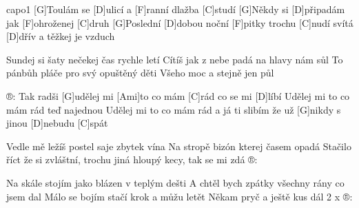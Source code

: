 \hfill capo1
[G]Toulám se [D]ulicí a [F]ranní dlažba [C]studí
[G]Někdy si [D]připadám jak [F]ohroženej [C]druh
[G]Poslední [D]dobou noční [F]pitky trochu [C]nudí
svítá [D]dřív a těžkej je vzduch

Sundej si šaty nečekej čas rychle letí
Cítíš jak z nebe padá na hlavy nám sůl
To pánbůh pláče pro svý opuštěný děti
Všeho moc a stejně jen půl

®: Tak radši [G]udělej mi 
[Ami]to co mám [C]rád co se mi [D]líbí
Udělej mi to co mám rád teď najednou
Udělej mi to co mám rád a já ti slibím
že už [G]nikdy s jinou [D]nebudu [C]spát

Vedle mě ležíš postel saje zbytek vína
Na stropě bizón kterej časem opadá
Stačilo říct že si zvláštní, trochu jiná
hloupý kecy, tak se mi zdá
®:

Na skále stojím jako blázen v teplým dešti
A chtěl bych zpátky všechny rány co jsem dal
Málo se bojím stačí krok a můžu letět
Někam pryč a ještě kus dál
2 x ®:


